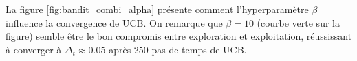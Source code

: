 
La figure \ref{fig:bandit_combi_alpha} présente comment l'hyperparamètre $\beta$ influence la
convergence de UCB.
On remarque que $\beta=10$ (courbe verte sur la figure) semble être le bon compromis entre exploration et exploitation,
réussissant à converger à $\Delta_t \approx 0.05$ après 250 pas de temps de UCB.

